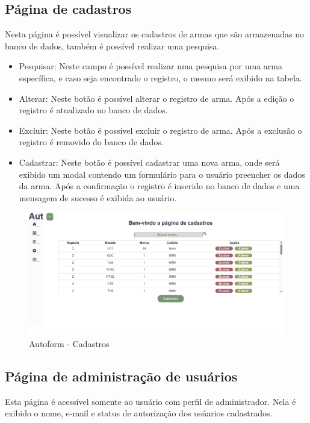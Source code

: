 \subsection{Página de cadastros}
Nesta página é possível visualizar os cadastros de armas que são armazenadas no banco de dados, também é possível realizar uma pesquisa.
\begin{itemize}
    \item Pesquisar: Neste campo é possível realizar uma pesquisa por uma arma específica, e caso seja encontrado o registro, o mesmo será exibido na tabela.
    \item Alterar: Neste botão é possível alterar o registro de arma. Após a edição o registro é atualizado no banco de dados.
    \item Excluir: Neste botão é possível excluir o registro de arma. Após a exclusão o registro é removido do banco de dados.
    \item Cadastrar: Neste botão é possível cadastrar uma nova arma, onde será exibido um modal contendo um formulário para o usuário preencher os dados da arma. Após a confirmação o registro é inserido no banco de dados e uma mensagem de sucesso é exibida ao usuário.
\end{itemize}

\begin{figure}[H]
    \caption{\label{fig:tela-cadastros-armas}Autoform - Cadastros}
    \begin{center}
        \includegraphics[scale=0.5]{imagens/autoform-cadastros.png}
    \end{center}
\end{figure}

\subsection{Página de administração de usuários}
Esta página é acessível somente ao usuário com perfil de administrador.
Nela é exibido o nome, e-mail e status de autorização dos usúarios cadastrados.

